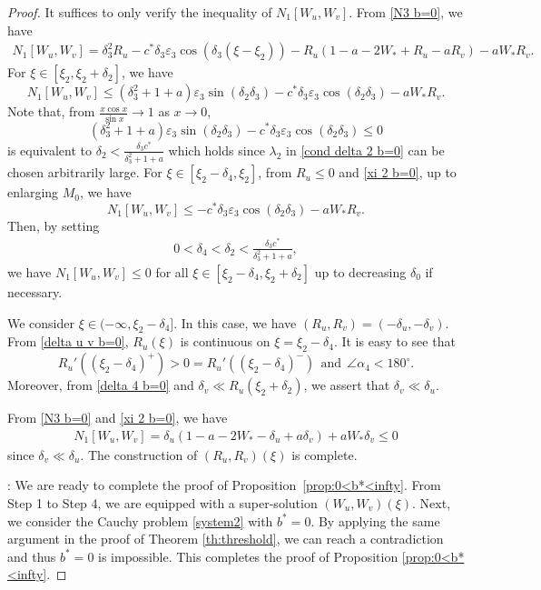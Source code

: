 \documentclass[11pt,a4paper]{article}
\numberwithin{equation}{section}
\numberwithin{figure}{section}
\newcommand\bea{\begin{eqnarray}}
\newcommand\eea{\end{eqnarray}}
\newcommand\beaa{\begin{eqnarray*}}
\newcommand\eeaa{\end{eqnarray*}}
\begin{document}
\begin{proof}
It suffices to only verify the inequality of $N_1[W_u,W_v]$. From \eqref{N3 b=0}, we have
\beaa
N_1[W_u,W_v]=\delta_3^2R_u-c^*\delta_3\varepsilon_3\cos(\delta_3(\xi-\xi_2))-R_u(1-a-2W_*+R_u-aR_v)-aW_*R_v.
\eeaa
For $\xi\in[\xi_2,\xi_2+\delta_2]$, we have
$$N_1[W_u,W_v]\le (\delta_3^2+1+a)\varepsilon_3\sin(\delta_2\delta_3)-c^*\delta_3\varepsilon_3\cos(\delta_2\delta_3)-aW_*R_v.$$
Note that, from $\frac{x\cos x}{\sin x}\to 1$ as $x\to 0$,
$$(\delta_3^2+1+a)\varepsilon_3\sin(\delta_2\delta_3)-c^*\delta_3\varepsilon_3\cos(\delta_2\delta_3)\le 0$$
is equivalent to $\delta_2<\frac{\delta_3c^*}{\delta_3^2+1+a}$ which holds since $\lambda_2$ in \eqref{cond delta 2 b=0} can be chosen arbitrarily large.
For $\xi\in[\xi_2-\delta_4,\xi_2]$, from $R_u\le 0$ and \eqref{xi 2 b=0}, up to enlarging $M_0$, we have
$$N_1[W_u,W_v]\le -c^*\delta_3\varepsilon_3\cos(\delta_2\delta_3)-aW_*R_v.$$
Then, by setting
\bea\label{delta 4 b=0}
0<\delta_4<\delta_2<\frac{\delta_3c^*}{\delta_3^2+1+a},
\eea
we have $N_1[W_u,W_v]\le 0$ for all $\xi\in[\xi_2-\delta_4,\xi_2+\delta_2]$ up to decreasing $\delta_0$ if necessary.

\medskip

 We consider $\xi\in(-\infty,\xi_{2}-\delta_4]$. In this case, we have $(R_u,R_v)=(-\delta_u,-\delta_v)$.
From \eqref{delta u v b=0}, $R_u(\xi)$ is continuous on $\xi=\xi_2-\delta_4$. It is easy to see that 
$$R_u'((\xi_2-\delta_4)^+)>0=R_u'((\xi_2-\delta_4)^-)\ \ \text{and}\ \ \angle \alpha_4<180^{\circ}.$$
 Moreover, from \eqref{delta 4 b=0} and $\delta_v\ll R_u(\xi_2+\delta_2)$, we assert that $\delta_v\ll\delta_u$.

From \eqref{N3 b=0} and \eqref{xi 2 b=0}, we have
\beaa
N_1[W_u,W_v]=\delta_u(1-a-2W_*-\delta_u+a\delta_v)+aW_*\delta_v\le 0
\eeaa
since $\delta_v\ll\delta_u$. The construction of $(R_u,R_v)(\xi)$ is complete.

\medskip


: We are ready to complete the proof of Proposition~\ref{prop:0<b*<infty}.
From Step 1 to Step 4, we are equipped with a super-solution $(W_u,W_v)(\xi)$.
Next, we consider the Cauchy problem \eqref{system2} with $b^*=0$.
By applying the same argument in the proof of Theorem \ref{th:threshold}, %
we can reach a contradiction and thus $b^*=0$ is impossible. This completes the proof of Proposition \ref{prop:0<b*<infty}.
\end{proof}
\end{document}
